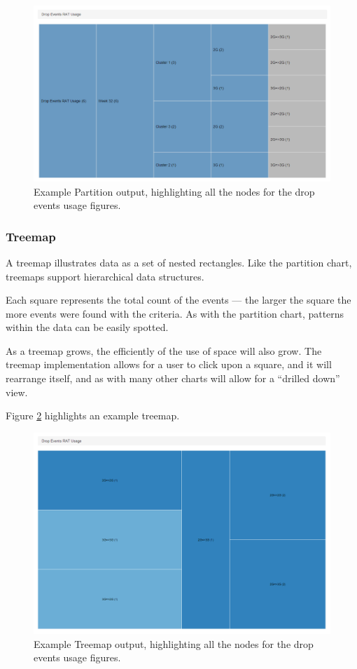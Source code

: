 \begin{figure}[H]
  \centering
    \includegraphics[scale=0.50]{chapter8/visualisation/partition.png}
    \caption[Example Partition output]
            {Example Partition output, highlighting all the nodes for the drop 
             events usage figures.}
    \label{fig:partition_chart}
\end{figure}


\newpage
\subsubsection{Treemap}
A treemap illustrates data as a set of nested rectangles. Like the partition 
chart, treemaps support hierarchical data structures.

Each square represents the total count of the events --- the larger the square 
the more events were found with the criteria. As with the partition chart, 
patterns within the data can be easily spotted. 

As a treemap grows, the efficiently of the use of space will also grow. The 
treemap implementation allows for a user to click upon a square, and it will 
rearrange itself, and as with many other charts will allow for a ``drilled 
down'' view.

Figure \ref{fig:treemap} highlights an example treemap.

\begin{figure}[H]
  \centering
    \includegraphics[scale=0.55]{chapter8/visualisation/treemap.png}
    \caption[Example Treemap output]
            {Example Treemap output, highlighting all the nodes for the drop 
             events usage figures.}
    \label{fig:treemap}
\end{figure}